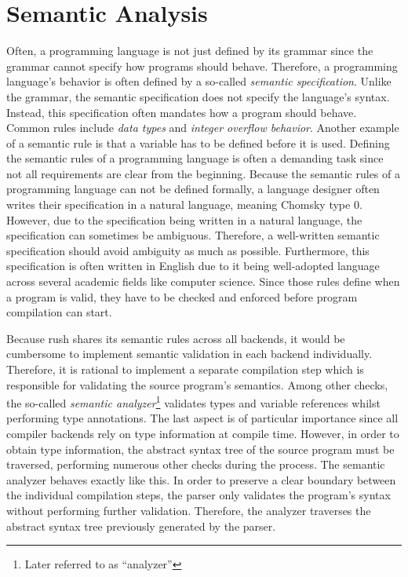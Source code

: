 \section{Semantic Analysis}

Often, a programming language is not just defined by its grammar
since the grammar cannot specify how programs should behave.
Therefore, a programming language's behavior is often defined by a so-called \emph{semantic specification}.
Unlike the grammar, the semantic specification does not specify the language's syntax.
Instead, this  specification often mandates how a program should behave.
Common rules include \emph{data types} and \emph{integer overflow behavior}.
Another example of a semantic rule is that a variable has to be defined before it is used.
Defining the semantic rules of a programming language is often a demanding task
since not all requirements are clear from the beginning.
Because the semantic rules of a programming language can not be defined formally,
a language designer often writes their specification in a natural language, meaning Chomsky type 0.
However, due to the specification being written in a natural language, the specification can sometimes be ambiguous.
Therefore, a well-written semantic specification should avoid ambiguity as much as possible.
Furthermore, this specification is often written in English
due to it being well-adopted language across several academic fields like computer science.
Since those rules define when a program is valid, they have to be checked and enforced before program compilation can start.

Because rush shares its semantic rules across all backends,
it would be cumbersome to implement semantic validation in each
backend individually. Therefore, it is rational to implement a separate
compilation step which is responsible for validating the source program's
semantics. Among other checks, the so-called \emph{semantic analyzer}\footnote{Later referred to as \enquote{analyzer}} validates types
and variable references whilst performing type annotations. The last aspect is
of particular importance since all compiler backends rely on type information at
compile time. However, in order to obtain type information, the abstract syntax
tree of the source program must be traversed, performing numerous other checks
during the process. The semantic analyzer behaves exactly like this. In order to
preserve a clear boundary between the individual compilation steps, the parser
only validates the program's syntax without performing further validation.
Therefore, the analyzer traverses the abstract syntax tree previously generated
by the parser.

